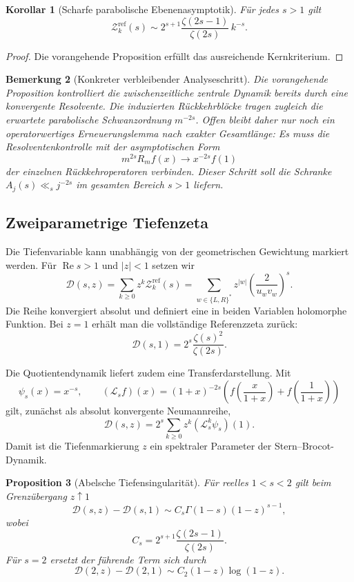 \documentclass[11pt,a4paper]{article}
\newtheorem{remark}{Bemerkung}[section]
\newtheorem{proposition}[remark]{Proposition}
\newtheorem{corollary}[remark]{Korollar}
\begin{document}
\begin{corollary}[Scharfe parabolische Ebenenasymptotik]
Für jedes $s>1$ gilt
\[
 \mathcal Z_k^{\mathrm{ref}}(s)
 \sim
 2^{s+1}\frac{\zeta(2s-1)}{\zeta(2s)}\,k^{-s}.
\]
\end{corollary}

\begin{proof}
Die vorangehende Proposition erfüllt das ausreichende Kernkriterium.
\end{proof}

\begin{remark}[Konkreter verbleibender Analyseschritt]
Die vorangehende Proposition kontrolliert die zwischenzeitliche zentrale
Dynamik bereits durch eine konvergente Resolvente. Die induzierten
Rückkehrblöcke tragen zugleich die erwartete parabolische Schwanzordnung
$m^{-2s}$. Offen bleibt daher nur noch ein operatorwertiges
Erneuerungslemma nach exakter Gesamtlänge: Es muss die Resolventenkontrolle
mit der asymptotischen Form
\[
 m^{2s}R_mf(x)\longrightarrow x^{-2s}f(1)
\]
der einzelnen Rückkehroperatoren verbinden. Dieser Schritt soll die
Schranke $A_j(s)\ll_s j^{-2s}$ im gesamten Bereich $s>1$ liefern.
\end{remark}

\subsection{Zweiparametrige Tiefenzeta}

Die Tiefenvariable kann unabhängig von der geometrischen Gewichtung
markiert werden. Für $\operatorname{Re}s>1$ und $|z|<1$ setzen wir
\[
 \mathscr D(s,z)
 =
 \sum_{k\ge0}z^k\mathcal Z_k^{\mathrm{ref}}(s)
 =
 \sum_{w\in\{L,R\}^*}
 z^{|w|}\left(\frac{2}{u_wv_w}\right)^s.
\]
Die Reihe konvergiert absolut und definiert eine in beiden Variablen
holomorphe Funktion. Bei $z=1$ erhält man die vollständige
Referenzzeta zurück:
\[
 \mathscr D(s,1)
 =
 2^s\frac{\zeta(s)^2}{\zeta(2s)}.
\]

Die Quotientendynamik liefert zudem eine Transferdarstellung. Mit
\[
 \psi_s(x)=x^{-s},
 \qquad
 (\mathcal L_sf)(x)
 =(1+x)^{-2s}
 \left(
 f\!\left(\frac{x}{1+x}\right)
 +f\!\left(\frac1{1+x}\right)
 \right)
\]
gilt, zunächst als absolut konvergente Neumannreihe,
\[
 \mathscr D(s,z)
 =
 2^s\sum_{k\ge0}z^k
 (\mathcal L_s^k\psi_s)(1).
\]
Damit ist die Tiefenmarkierung $z$ ein spektraler Parameter der
Stern--Brocot-Dynamik.

\begin{proposition}[Abelsche Tiefensingularität]
Für reelles $1<s<2$ gilt beim Grenzübergang $z\uparrow1$
\[
 \mathscr D(s,z)-\mathscr D(s,1)
 \sim
 C_s\Gamma(1-s)(1-z)^{s-1},
\]
wobei
\[
 C_s=
 2^{s+1}\frac{\zeta(2s-1)}{\zeta(2s)}.
\]
Für $s=2$ ersetzt der führende Term sich durch
\[
 \mathscr D(2,z)-\mathscr D(2,1)
 \sim
 C_2(1-z)\log(1-z).
\]
\end{proposition}
\end{document}
